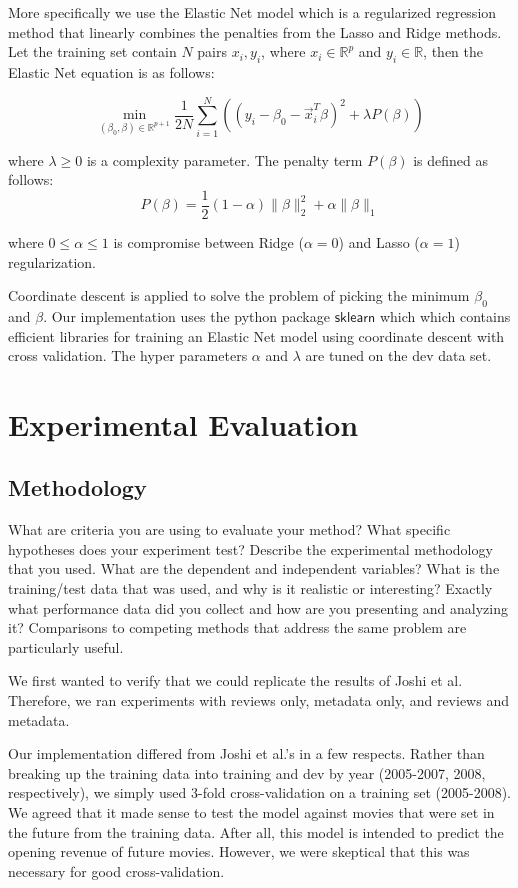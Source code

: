 \documentclass[11pt]{article}
\begin{document}
More specifically we use the Elastic Net model which is a regularized regression method
that linearly combines the penalties from the Lasso and Ridge methods. Let the training
set contain $N$ pairs $x_i,y_i$, where $x_i \in \mathbb{R}^p$ and $y_i \in \mathbb{R}$,
then the Elastic Net equation is as follows:

$$ \min_{(\beta_0, \beta) \in \mathbb{R}^{p+1}} \frac{1}{2N} \sum_{i=1}^N \left(
(y_i - \beta_0 - \vec{x}_i^T\beta)^2 + \lambda P(\beta)\right)$$

\noindent where $\lambda \geq 0$ is a complexity parameter. The penalty term $P(\beta)$
is defined as follows:
$$P(\beta) = \frac{1}{2}(1 - \alpha) \| \beta \|_2^2 + \alpha \|\beta\|_1$$

\noindent where $0 \leq \alpha \leq 1$ is compromise between Ridge ($\alpha = 0$) and
Lasso ($\alpha = 1$) regularization.

Coordinate descent is applied to solve the problem of picking the minimum $\beta_0$ and
$\beta$. Our implementation uses the python package $\mathsf{sklearn}$ which which
contains efficient libraries for training an Elastic Net model using coordinate descent
with cross validation. The hyper parameters $\alpha$ and $\lambda$ are tuned on the dev
data set.

\section{Experimental Evaluation}
\subsection{Methodology}
What are criteria you are using to evaluate your method? What specific hypotheses does
your experiment test? Describe the experimental methodology that you used. What are the
dependent and independent variables? What is the training/test data that was used, and why
is it realistic or interesting? Exactly what performance data did you collect and how are
you presenting and analyzing it? Comparisons to competing methods that address the same
problem are particularly useful.

We first wanted to verify that we could replicate the results of Joshi et al.
Therefore, we ran experiments with reviews only, metadata only, and reviews and metadata. 

Our implementation differed 
from Joshi et al.'s in a few respects. Rather than breaking up the training data into 
training and dev by year (2005-2007, 2008, respectively), we simply used
3-fold cross-validation on a training set (2005-2008). We agreed that it made sense
to test the model against movies that were set in the future from the training data.
After all, this model is intended to predict the opening revenue of future movies.
However, we were skeptical that this was necessary for good cross-validation.
\end{document}
